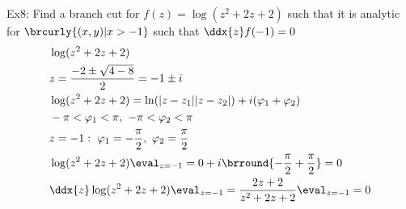 Ex8: Find a branch cut for $f(z)=\log(z^2+2z+2)$ such that it is analytic for $\brcurly{(x,y)|x>-1}$ such that $\ddx{z}f(-1)=0$
\begin{align*}
    &\log(z^2+2z+2)\\
    &z=\frac{-2\pm\sqrt{4-8}}{2}=-1\pm i\\
    &\log(z^2+2z+2)=\ln(|z-z_1||z-z_2|)+i(\varphi_1+\varphi_2)\\
    &-\pi<\varphi_1<\pi,\ -\pi<\varphi_2<\pi\\
    &z=-1:\ \varphi_1=-\frac{\pi}{2},\ \varphi_2=\frac{\pi}{2}\\
    &\log(z^2+2z+2)\eval_{z=-1}=0+i\brround{-\frac{\pi}{2}+\frac{\pi}{2}}=0\\
    &\ddx{z}\log(z^2+2z+2)\eval_{z=-1}=\frac{2z+2}{z^2+2z+2}\eval_{z=-1}=0
\end{align*}